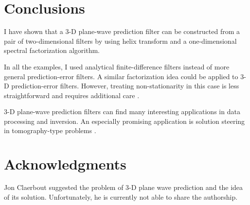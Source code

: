 
\section{Conclusions}
I have shown that a 3-D plane-wave prediction filter can be
constructed from a pair of two-dimensional filters by using helix
transform and a one-dimensional spectral factorization algorithm.
\par
In all the examples, I used analytical finite-difference filters
instead of more general prediction-error filters.  A similar
factorization idea could be applied to 3-D prediction-error filters.
However, treating non-stationarity in this case is less
straightforward and requires additional care
\cite[]{Crawley.sep.97.sean2,Clapp.sep.100.bob3}.
\par
3-D plane-wave prediction filters can find many interesting
applications in data processing and inversion.  An especially
promising application is solution steering in tomography-type
problems \cite[]{Clapp.sep.95.bob1,Clapp.sep.97.bob2}.


\section{Acknowledgments}
Jon Claerbout suggested the problem of 3-D plane wave prediction and
the idea of its solution.  Unfortunately, he is currently not able to
share the authorship.




